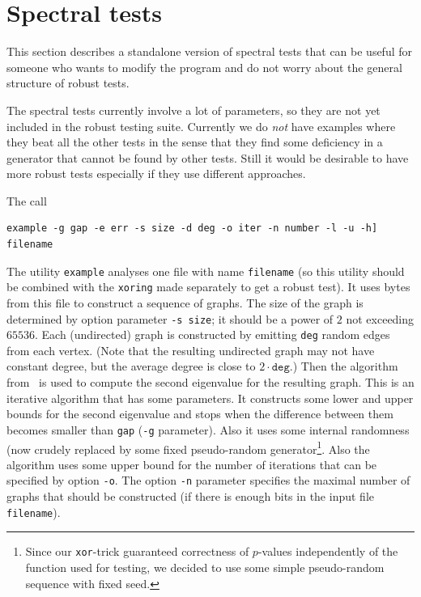 \documentclass[12pt,a4paper,fullpage]{article}
\begin{document}
\section{Spectral tests}

This section describes a standalone version of spectral tests that can be useful for someone who wants to modify the program and do not worry about the general structure of robust tests.

The spectral tests currently involve a lot of parameters, so they are not yet included in the robust testing suite. Currently we do \emph{not} have examples where they beat all the other tests in the sense that they find some deficiency in a generator that cannot be found by other tests. Still it would be desirable to have more robust tests especially if they use different approaches.

The call
\begin{verbatim}
example -g gap -e err -s size -d deg -o iter -n number -l -u -h] filename
\end{verbatim}

The utility \texttt{example} analyses one file with name \texttt{filename} (so this utility should be combined with the \texttt{xoring} made separately to get a robust test). It uses bytes from this file to construct a sequence of graphs. The size of the graph is determined by option parameter \texttt{-s size}; it should be a power of $2$ not exceeding $65536$. Each (undirected) graph is constructed by emitting \texttt{deg} random edges from each vertex. (Note that the resulting undirected graph may not have constant degree, but the average degree is close to $2\cdot\texttt{deg}$.) Then the algorithm from~\cite{ollivier} is used to compute the second eigenvalue for the resulting graph. This is an iterative algorithm that has some parameters. It constructs some lower and upper bounds for the second eigenvalue and stops when the difference between them becomes smaller than \texttt{gap} (\texttt{-g} parameter). Also it uses some internal randomness (now crudely replaced by some fixed pseudo-random generator\footnote{Since our \texttt{xor}-trick guaranteed correctness of $p$-values independently of the function used for testing, we decided to use some simple pseudo-random sequence with fixed seed.}. Also the algorithm uses some upper bound for the number of iterations that can be specified by option \texttt{-o}. The option \texttt{-n} parameter specifies the maximal number of graphs that should be constructed (if there is enough bits in the input file \texttt{filename}).
\end{document}
